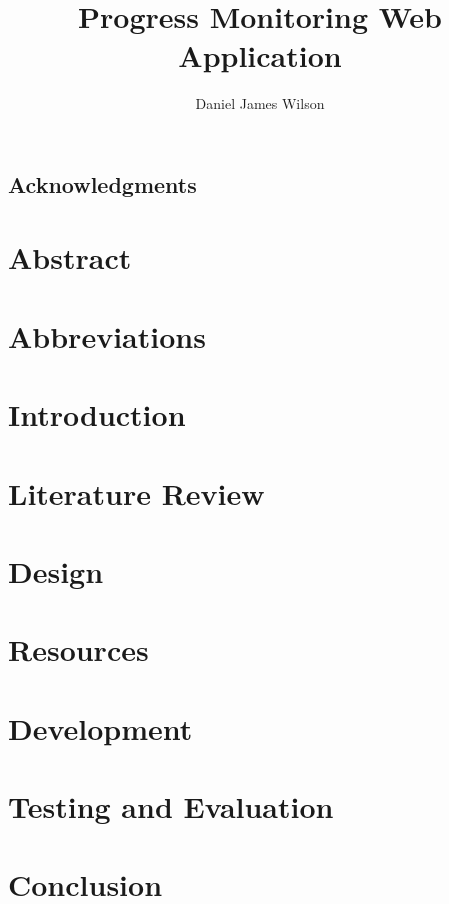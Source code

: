 \documentclass[titlepage,a4paper,11pt,oneside]{book} %
\author{Daniel James Wilson}
\title{Progress Monitoring Web Application}
\date{\parbox{\linewidth}{\centering%
  \today\endgraf\bigskip
  Moi Hoon Yap}}
\begin{document}
\frontmatter %
\maketitle

\begin{center}
\chapter{Acknowledgments}

\end{center}

\chapter{Abstract}


\tableofcontents

\pagebreak
{}
\listoffigures
\pagebreak

\listoftables

\chapter{Abbreviations}

\mainmatter %
\chapter{Introduction}
\label{sec:mainIntro}


\chapter{Literature Review}
\label{sec:litrev}


\chapter{Design}
\label{sec:design}


\chapter{Resources}
\label{sec:resources}


\chapter{Development}
\label{sec:dev}


\chapter{Testing and Evaluation}
\label{sec:test}


\chapter{Conclusion}
\label{sec:conc}


\pagebreak
\renewcommand{\bibname}{References}

\end{document}
